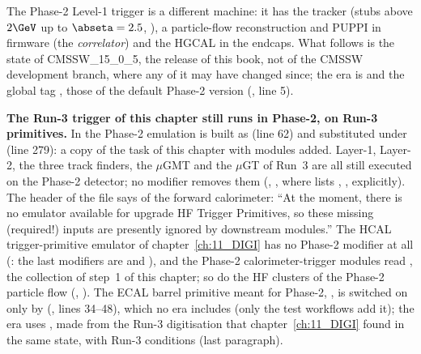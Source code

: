 The Phase-2 Level-1 trigger is a different machine: it has the tracker (stubs above $2\GeV$ up to $\abseta=2.5$,
), a particle-flow reconstruction and PUPPI in firmware (the
\emph{correlator}) and the HGCAL in the endcaps. What follows is the state of CMSSW\_15\_0\_5, the release of this
book, not of the CMSSW development branch, where any of it may have changed since; the era is  and
the global tag , those of the default Phase-2 version 
(, line 5).

\textbf{The Run-3 trigger of this chapter still runs in Phase-2, on Run-3 primitives.} In
 the Phase-2 emulation is built as
 (line 62) and substituted under  (line
279): a copy of the task of this chapter with modules added. Layer-1, Layer-2, the three track finders, the $\mu$GMT
and the $\mu$GT of Run~3 are all still executed on the Phase-2 detector; no modifier removes them
(, , where
 lists , ,  explicitly). The header
of the file says of the forward calorimeter: ``At the moment, there is no emulator available for upgrade HF Trigger
Primitives, so these missing (required!) inputs are presently ignored by downstream modules.'' The HCAL
trigger-primitive emulator of chapter~\ref{ch:11_DIGI} has no Phase-2 modifier at all
(: the last modifiers are  and
), and the Phase-2 calorimeter-trigger modules read , the
collection of step~1 of this chapter; so do the HF clusters of the Phase-2 particle flow (,
). The ECAL barrel primitive meant for
Phase-2, , is switched on only by 
(, lines 34--48), which no era includes (only the
test workflows  add it); the era uses , made from the Run-3
digitisation that chapter~\ref{ch:11_DIGI} found in the same state, with Run-3 conditions (last paragraph).

